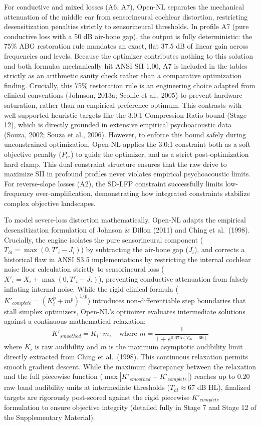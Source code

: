 \documentclass[
  12pt,
]{article}
\begin{document}
For conductive and mixed losses (A6, A7), Open-NL separates the
mechanical attenuation of the middle ear from sensorineural cochlear
distortion, restricting desensitization penalties strictly to
sensorineural thresholds. In profile A7 (pure conductive loss with a 50
dB air-bone gap), the output is fully deterministic: the 75\% ABG
restoration rule mandates an exact, flat 37.5 dB of linear gain across
frequencies and levels. Because the optimizer contributes nothing to
this solution and both formulas mechanically hit ANSI SII 1.00, A7 is
included in the tables strictly as an arithmetic sanity check rather
than a comparative optimization finding. Crucially, this 75\%
restoration rule is an engineering choice adapted from clinical
conventions (Johnson, 2013a; Scollie et al., 2005) to prevent hardware
saturation, rather than an empirical preference optimum. This contrasts
with well-supported heuristic targets like the 3.0:1 Compression Ratio
bound (Stage 12), which is directly grounded in extensive empirical
psychoacoustic data (Souza, 2002; Souza et al., 2006). However, to
enforce this bound safely during unconstrained optimization, Open-NL
applies the 3.0:1 constraint both as a soft objective penalty
(\(P_{cr}\)) to guide the optimizer, and as a strict post-optimization
hard clamp. This dual constraint structure ensures that the raw drive to
maximize SII in profound profiles never violates empirical
psychoacoustic limits. For reverse-slope losses (A2), the SD-LFP
constraint successfully limits low-frequency over-amplification,
demonstrating how integrated constraints stabilize complex objective
landscapes.

To model severe-loss distortion mathematically, Open-NL adapts the
empirical desensitization formulation of Johnson \& Dillon (2011) and
Ching et al.~(1998). Crucially, the engine isolates the pure
sensorineural component (\(T_{hl} = \max(0, T'_i - J_i)\)) by
subtracting the air-bone gap (\(J_i\)), and corrects a historical flaw
in ANSI S3.5 implementations by restricting the internal cochlear noise
floor calculation strictly to sensorineural loss
(\(X'_i = X_i + \max(0, T'_i - J_i)\)), preventing conductive
attenuation from falsely inflating internal noise. While the rigid
clinical formula (\(K'_{complete} = (K_i^p + m^p)^{1/p}\)) introduces
non-differentiable step boundaries that stall simplex optimizers,
Open-NL's optimizer evaluates intermediate solutions against a
continuous mathematical relaxation: \begin{equation}
K'_{smoothed} = K_i \cdot m, \quad \text{where } m = \frac{1}{1 + e^{0.075(T_{hl} - 66)}}
\end{equation} where \(K_i\) is raw audibility and \(m\) is the maximum
asymptotic audibility limit directly extracted from Ching et al.~(1998).
This continuous relaxation permits smooth gradient descent. While the
maximum discrepancy between the relaxation and the full piecewise
function (\(\max|K'_{smoothed} - K'_{complete}|\)) reaches up to 0.20
raw band audibility units at intermediate thresholds
(\(T_{hl} \approx 67\) dB HL), finalized targets are rigorously
post-scored against the rigid piecewise \(K'_{complete}\) formulation to
ensure objective integrity (detailed fully in Stage 7 and Stage 12 of
the Supplementary Material).
\end{document}
